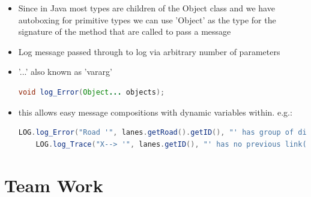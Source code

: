 \begin{itemize}
\begin{itemize}
    	\item message origin (class name usually)
\begin{lstlisting}[language=java]
	private static Logger_Interface LOG = Logger.getLoggerInstance(Road.class.getSimpleName());
\end{lstlisting}
    	\item NORMAL MSG
		\item message level (Fatal, error, normal msg, debug, trace)
    	\item EXCEPTIONS
    	\item stack trace of the exception
    \end{itemize}
    \item Since in Java most types are children of the Object class and we have autoboxing \cite{Oracle1995} for primitive types we can use 'Object' as the type for the signature of the method that are called to pass a message
    \item Log message passed through to log via arbitrary number of parameters
    \item '...' also known as 'vararg' \cite{Oracle2004}
\begin{lstlisting}[language=Java]
	void log_Error(Object... objects);
\end{lstlisting}   
	\item this allows easy message compositions with dynamic variables within. e.g.:
\begin{lstlisting}[language=Java]
	LOG.log_Error("Road '", lanes.getRoad().getID(), "' has group of directed lanes with partly implemented Links (Back). ", link_count, "/", lanes.getNumberOfLanes(), " Lanes connected to a link.");
	LOG.log_Trace("X--> '", lanes.getID(), "' has no previous link(s).");
\end{lstlisting} 

\end{itemize}


\section{Team Work}

